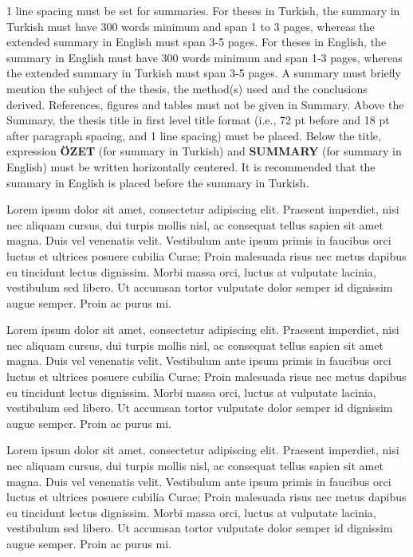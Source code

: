 1 line spacing must be set for summaries. For theses in Turkish, the summary in
Turkish must have 300 words minimum and span 1 to 3 pages, whereas the extended
summary in English must span 3-5 pages.
For theses in English, the summary in English must have 300 words minimum and
span 1-3 pages, whereas the extended summary in Turkish must span 3-5 pages.
A summary must briefly mention the subject of the thesis, the method(s) used and 
the conclusions derived.
References, figures and tables must not be given in Summary.
Above the Summary, the thesis title in first level title format 
(i.e., 72 pt before and 18 pt after paragraph spacing, and 1 line 
spacing) must be placed. Below the title, expression {\bf \"OZET} 
(for summary in Turkish) and {\bf SUMMARY} (for summary in English)
must be written horizontally centered.
It is recommended that the summary in English is placed before
the summary in Turkish.

Lorem ipsum dolor sit amet, consectetur adipiscing elit. Praesent imperdiet, nisi 
nec aliquam cursus, dui turpis mollis nisl, ac consequat tellus sapien sit amet 
magna. Duis vel venenatis velit. Vestibulum ante ipsum primis in faucibus orci 
luctus et ultrices posuere cubilia Curae; Proin malesuada risus nec metus dapibus 
eu tincidunt lectus dignissim. Morbi massa orci, luctus at vulputate lacinia, 
vestibulum sed libero. Ut accumsan tortor vulputate dolor semper id dignissim 
augue semper. Proin ac purus mi. 

Lorem ipsum dolor sit amet, consectetur adipiscing elit. Praesent imperdiet, nisi 
nec aliquam cursus, dui turpis mollis nisl, ac consequat tellus sapien sit amet 
magna. Duis vel venenatis velit. Vestibulum ante ipsum primis in faucibus orci 
luctus et ultrices posuere cubilia Curae; Proin malesuada risus nec metus dapibus 
eu tincidunt lectus dignissim. Morbi massa orci, luctus at vulputate lacinia, 
vestibulum sed libero. Ut accumsan tortor vulputate dolor semper id dignissim 
augue semper. Proin ac purus mi. 

Lorem ipsum dolor sit amet, consectetur adipiscing elit. Praesent imperdiet, nisi 
nec aliquam cursus, dui turpis mollis nisl, ac consequat tellus sapien sit amet 
magna. Duis vel venenatis velit. Vestibulum ante ipsum primis in faucibus orci 
luctus et ultrices posuere cubilia Curae; Proin malesuada risus nec metus dapibus 
eu tincidunt lectus dignissim. Morbi massa orci, luctus at vulputate lacinia, 
vestibulum sed libero. Ut accumsan tortor vulputate dolor semper id dignissim 
augue semper. Proin ac purus mi. 

